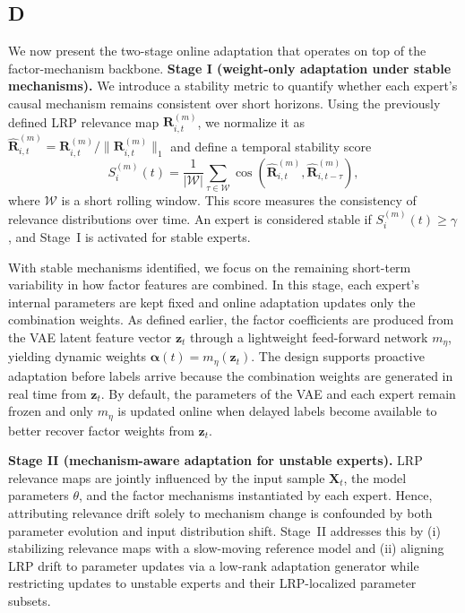 ﻿\documentclass[journal]{IEEEtran}
\newenvironment{auditproblemblock}{\begingroup\color{red}}{\endgroup}
\begin{document}
\begin{auditproblemblock}
\subsection{D}
We now present the two-stage online adaptation that operates on top of the factor-mechanism backbone.
\textbf{Stage I (weight-only adaptation under stable mechanisms).}
We introduce a stability metric to quantify whether each expert's causal mechanism remains consistent over short horizons. Using the previously defined LRP relevance map $\mathbf{R}_{i,t}^{(m)}$, we normalize it as $\hat{\mathbf{R}}_{i,t}^{(m)}=\mathbf{R}_{i,t}^{(m)}/\|\mathbf{R}_{i,t}^{(m)}\|_{1}$ and define a temporal stability score
\begin{equation}
S_{i}^{(m)}(t)=\frac{1}{|\mathcal{W}|}\sum_{\tau\in\mathcal{W}} \cos\!\left(\hat{\mathbf{R}}_{i,t}^{(m)},\hat{\mathbf{R}}_{i,t-\tau}^{(m)}\right),
\end{equation}
where $\mathcal{W}$ is a short rolling window. This score measures the consistency of relevance distributions over time. An expert is considered stable if $S_{i}^{(m)}(t)\ge\gamma$, and Stage~I is activated for stable experts.

With stable mechanisms identified, we focus on the remaining short-term variability in how factor features are combined. In this stage, each expert's internal parameters are kept fixed and online adaptation updates only the combination weights. As defined earlier, the factor coefficients are produced from the VAE latent feature vector $\mathbf{z}_t$ through a lightweight feed-forward network $m_{\eta}$, yielding dynamic weights $\boldsymbol{\alpha}(t)=m_{\eta}(\mathbf{z}_t)$.
The design supports proactive adaptation before labels arrive because the combination weights are generated in real time from $\mathbf{z}_t$. By default, the parameters of the VAE and each expert remain frozen and only $m_{\eta}$ is updated online when delayed labels become available to better recover factor weights from $\mathbf{z}_t$.

 \textbf{Stage II (mechanism-aware adaptation for unstable experts).}
LRP relevance maps are jointly influenced by the input sample $\mathbf{X}_t$, the model parameters $\theta$, and the factor mechanisms instantiated by each expert. Hence, attributing relevance drift solely to mechanism change is confounded by both parameter evolution and input distribution shift. Stage~II addresses this by (i) stabilizing relevance maps with a slow-moving reference model and (ii) aligning LRP drift to parameter updates via a low-rank adaptation generator while restricting updates to unstable experts and their LRP-localized parameter subsets.


\end{auditproblemblock}
\end{document}
